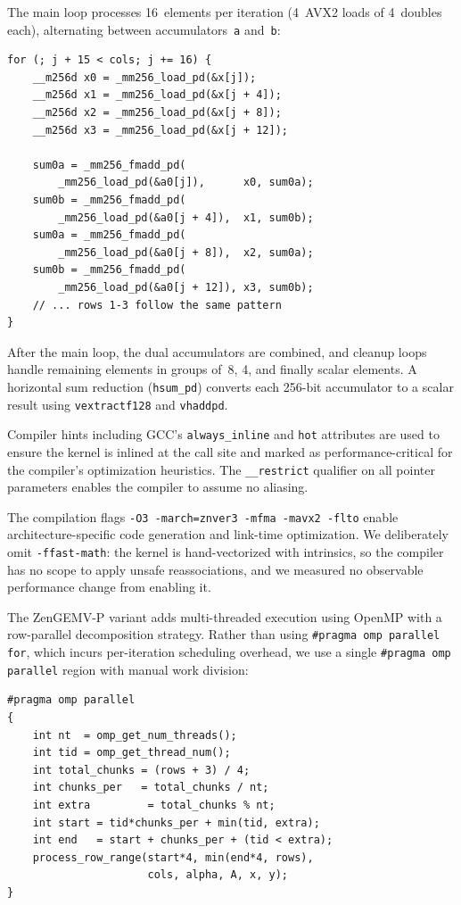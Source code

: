 \documentclass[runningheads]{llncs}
\begin{document}
The main loop processes 16~elements per iteration (4~AVX2 loads of 4~doubles
each), alternating between accumulators~\texttt{a} and~\texttt{b}:

\begin{lstlisting}[caption={Inner loop of ZenGEMV (abbreviated, showing 1 of 4
rows).},label={lst:kernel}]
for (; j + 15 < cols; j += 16) {
    __m256d x0 = _mm256_load_pd(&x[j]);
    __m256d x1 = _mm256_load_pd(&x[j + 4]);
    __m256d x2 = _mm256_load_pd(&x[j + 8]);
    __m256d x3 = _mm256_load_pd(&x[j + 12]);

    sum0a = _mm256_fmadd_pd(
        _mm256_load_pd(&a0[j]),      x0, sum0a);
    sum0b = _mm256_fmadd_pd(
        _mm256_load_pd(&a0[j + 4]),  x1, sum0b);
    sum0a = _mm256_fmadd_pd(
        _mm256_load_pd(&a0[j + 8]),  x2, sum0a);
    sum0b = _mm256_fmadd_pd(
        _mm256_load_pd(&a0[j + 12]), x3, sum0b);
    // ... rows 1-3 follow the same pattern
}
\end{lstlisting}

After the main loop, the dual accumulators are combined, and cleanup loops handle
remaining elements in groups of~8, 4, and finally scalar elements.
A horizontal sum reduction (\texttt{hsum\_pd}) converts each 256-bit accumulator
to a scalar result using \texttt{vextractf128} and \texttt{vhaddpd}\cite{avx2}.

Compiler hints including GCC's \texttt{always\_inline} and \texttt{hot}
attributes are used to ensure the kernel is inlined at the call site and marked
as performance-critical for the compiler's optimization heuristics.
The \texttt{\_\_restrict} qualifier on all pointer parameters enables the
compiler to assume no aliasing.

The compilation flags \texttt{-O3 -march=znver3 -mfma -mavx2 -flto}\cite{gccmanual}
enable architecture-specific code generation and link-time optimization.
We deliberately omit \texttt{-ffast-math}: the kernel is hand-vectorized
with intrinsics, so the compiler has no scope to apply unsafe reassociations,
and we measured no observable performance change from enabling it.

The ZenGEMV-P variant adds multi-threaded execution using OpenMP\cite{chandra2001parallel} with a
row-parallel decomposition strategy. Rather than using \texttt{\#pragma omp
parallel for}, which incurs per-iteration scheduling overhead, we use a single
\texttt{\#pragma omp parallel} region with manual work division:

\begin{lstlisting}[caption={Thread work division in ZenGEMV-P.},label={lst:omp}]
#pragma omp parallel
{
    int nt  = omp_get_num_threads();
    int tid = omp_get_thread_num();
    int total_chunks = (rows + 3) / 4;
    int chunks_per   = total_chunks / nt;
    int extra         = total_chunks % nt;
    int start = tid*chunks_per + min(tid, extra);
    int end   = start + chunks_per + (tid < extra);
    process_row_range(start*4, min(end*4, rows),
                      cols, alpha, A, x, y);
}
\end{lstlisting}
\end{document}
